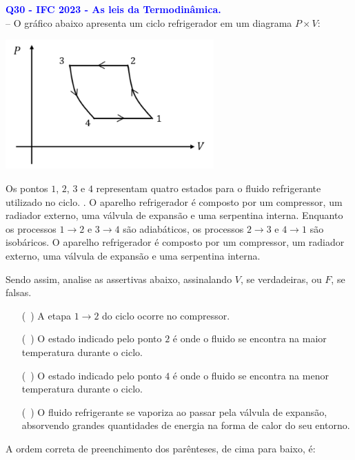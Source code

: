 \documentclass[a4paper,12pt]{article}
\begin{document}
\begin{flushleft}
\textbf{\textcolor{blue}{\Large Q30 - IFC 2023 - As leis da Termodinâmica.}}\\
\noindent
-- O gráfico abaixo apresenta um \colorbox{red!20}{ciclo refrigerador em um diagrama \( P \times V \):}

\begin{center}
\includegraphics[width=0.6\textwidth]{figures/ciclo_refrigerador.png}
\end{center}

Os pontos \(1\), \(2\), \(3\) e \(4\) representam quatro estados para o fluido refrigerante utilizado no ciclo.  
. O aparelho refrigerador é composto por um compressor, um radiador externo, uma válvula de expansão e uma serpentina interna.  
Enquanto os \colorbox{green!20}{processos \(1 \to 2\) e \(3 \to 4\) são adiabáticos}, \colorbox{blue!20}{os processos \(2 \to 3\) e \(4 \to 1\)} \colorbox{blue!20}{são isobáricos}.  O aparelho refrigerador é composto por um compressor, um radiador externo, uma válvula de expansão e uma serpentina interna.  

Sendo assim, analise as assertivas abaixo, assinalando \(V\), se verdadeiras, ou \(F\), se falsas.

\begin{itemize}
    \item[(\ )] A etapa \(1 \to 2\) do ciclo ocorre no compressor.
    \item[(\ )] O estado indicado pelo ponto \(2\) é onde o fluido se encontra na maior temperatura durante o ciclo.
    \item[(\ )] O estado indicado pelo ponto \(4\) é onde o fluido se encontra na menor temperatura durante o ciclo.
    \item[(\ )] O fluido refrigerante se vaporiza ao passar pela válvula de expansão, absorvendo grandes quantidades de energia na forma de calor do seu entorno.
\end{itemize}

A ordem correta de preenchimento dos parênteses, de cima para baixo, é: \underline{\hspace{3cm}}


\end{flushleft}
\end{document}
